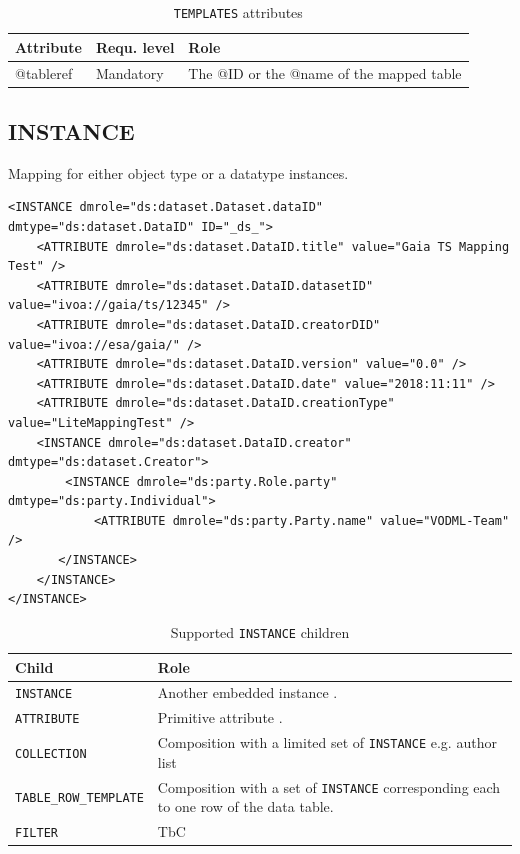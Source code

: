 \documentclass[11pt,a4paper]{ivoa}
\begin{document}
\begin{table}[ht!]
     \begin{tabular}{|p{1.5cm}|p{4cm}|p{7cm}|}
       \hline Attribute & Requ. level & Role\\
       \hline  @tableref  & Mandatory & The @ID or the @name of the mapped table  \\
       \hline 
     \end{tabular}
     \caption{\texttt{TEMPLATES} attributes} 
 \end{table}


\subsection{INSTANCE}

Mapping for either object type or a datatype instances.


\begin{lstlisting}[caption={INSTANCE bloc example},captionpos=b]
<INSTANCE dmrole="ds:dataset.Dataset.dataID" dmtype="ds:dataset.DataID" ID="_ds_">
    <ATTRIBUTE dmrole="ds:dataset.DataID.title" value="Gaia TS Mapping Test" />
    <ATTRIBUTE dmrole="ds:dataset.DataID.datasetID" value="ivoa://gaia/ts/12345" />
    <ATTRIBUTE dmrole="ds:dataset.DataID.creatorDID" value="ivoa://esa/gaia/" />
    <ATTRIBUTE dmrole="ds:dataset.DataID.version" value="0.0" />
    <ATTRIBUTE dmrole="ds:dataset.DataID.date" value="2018:11:11" />
    <ATTRIBUTE dmrole="ds:dataset.DataID.creationType" value="LiteMappingTest" />
    <INSTANCE dmrole="ds:dataset.DataID.creator" dmtype="ds:dataset.Creator">
        <INSTANCE dmrole="ds:party.Role.party" dmtype="ds:party.Individual">
            <ATTRIBUTE dmrole="ds:party.Party.name" value="VODML-Team" />
       </INSTANCE>
    </INSTANCE>
</INSTANCE>
\end{lstlisting}


\begin{table}[ht!]
     \begin{tabular}{|p{3cm}|p{7cm}|}
       \hline Child &  Role\\
       \hline  \texttt{INSTANCE}    & Another embedded instance . \\       
       \hline  \texttt{ATTRIBUTE}    & Primitive attribute . \\       
       \hline  \texttt{COLLECTION}    & Composition with a limited set of  \texttt{INSTANCE} e.g. author list\\      
       \hline  \texttt{TABLE\_ROW\_TEMPLATE}    & Composition with a set of  \texttt{INSTANCE} corresponding each to one row of the data table. \\
       \hline  \texttt{FILTER}    & TbC \\
       \hline 
     \end{tabular}
     \caption{Supported  \texttt{INSTANCE} children} 
 \end{table}
\end{document}

